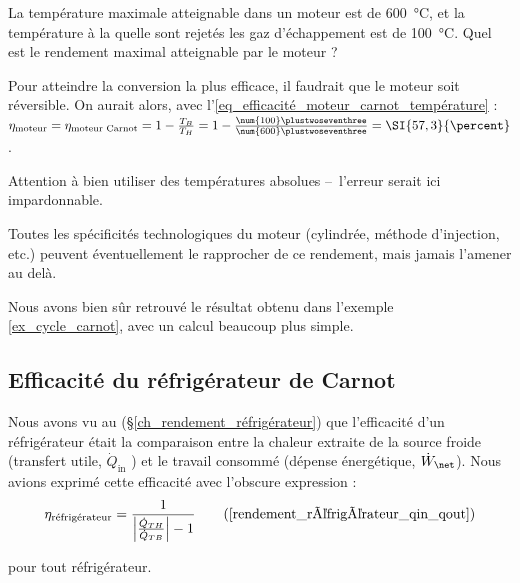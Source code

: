 		\begin{anexample}
		\label{ex_efficacite_moteur_carnot}
			La température maximale atteignable dans un moteur est de \SI{600}{\degreeCelsius}, et la température à la quelle sont rejetés les gaz d’échappement est de \SI{100}{\degreeCelsius}. Quel est le rendement maximal atteignable par le moteur ?
				\begin{answer}
					Pour atteindre la conversion la plus efficace, il faudrait que le moteur soit réversible. On aurait alors, avec l’\cref{eq_efficacité_moteur_carnot_température} : $\eta_\text{moteur} = \eta_\text{moteur Carnot} = 1 - \frac{T_B}{T_H} = 1 - \frac{\num{100}\plustwoseventhree}{\num{600}\plustwoseventhree} = \SI{57,3}{\percent}$.
					\begin{remark}Attention à bien utiliser des températures absolues --\ l’erreur serait ici impardonnable.\end{remark}
					\begin{remark}Toutes les spécificités technologiques du moteur (cylindrée, méthode d’injection, etc.) peuvent éventuellement le rapprocher de ce rendement, mais jamais l’amener au delà.\end{remark}
					\begin{remark}Nous avons bien sûr retrouvé le résultat obtenu dans l’exemple \ref{ex_cycle_carnot}, avec un calcul beaucoup plus simple.\end{remark}
				\end{answer}
		\end{anexample}


	\subsection{Efficacité du réfrigérateur de Carnot}

		Nous avons vu au (\S\ref{ch_rendement_réfrigérateur})	que l’efficacité d’un réfrigérateur était la comparaison entre la chaleur extraite de la source froide (transfert utile, $\dot Q_\text{in}$ ) et le travail consommé (dépense énergétique, $\dot W_\net$).  Nous avions exprimé cette efficacité avec l’obscure expression :
		\begin{equation}
			\eta_\text{réfrigérateur} = \frac{1}{ \left| \frac{\dot Q_{TH}}{\dot Q_{TB}} \right| - 1} \tag{\ref{rendement_réfrigérateur_qin_qout}}
		\end{equation}
		\begin{equationterms}
			\item pour tout réfrigérateur.
		\end{equationterms}

